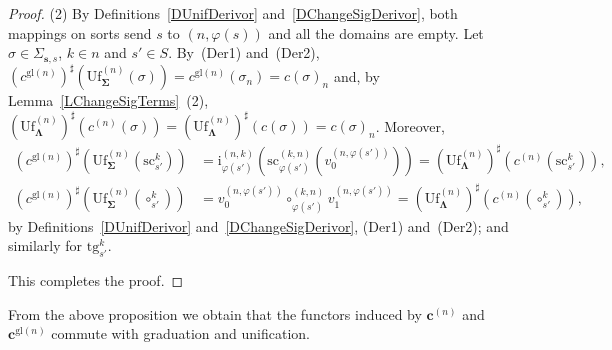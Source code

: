 \documentclass[a4paper, reqno
]{amsart}
\newcommand{\sig}[1]{\mathbf{#1}}             %
\newcommand{\gl}{\mathrm{gl}}                %
\newcommand{\src}{\mathrm{sc}}
\newcommand{\tgt}{\mathrm{tg}}
\newcommand{\Uf}{\mathrm{Uf}}
\theoremstyle{plain}
\theoremstyle{definition}
\begin{document}
\begin{proof}
(2) By Definitions~\ref{DUnifDerivor} and~\ref{DChangeSigDerivor}, both mappings on sorts send $s$ to $(n,\varphi(s))$ and all the domains are empty.
Let $\sigma\in\Sigma_{\mathbf{s},s}$, $k\in n$ and $s'\in S$.
By~(Der1) and~(Der2), $(c^{\gl(n)})^{\sharp}(\Uf^{(n)}_{\sig{\Sigma}}(\sigma))=c^{\gl(n)}(\sigma_{n})=c(\sigma)_{n}$ and, by Lemma~\ref{LChangeSigTerms}~(2), $(\Uf^{(n)}_{\sig{\Lambda}})^{\sharp}(c^{(n)}(\sigma))=(\Uf^{(n)}_{\sig{\Lambda}})^{\sharp}(c(\sigma))=c(\sigma)_{n}$.
Moreover,
\begin{align*}
(c^{\gl(n)})^{\sharp}\left(\Uf^{(n)}_{\sig{\Sigma}}(\src^{k}_{s'})\right)
&=
\mathrm{i}^{(n,k)}_{\varphi(s')}\left(\src^{(k,n)}_{\varphi(s')}\left(v^{(n,\varphi(s'))}_{0}\right)\right)
=
(\Uf^{(n)}_{\sig{\Lambda}})^{\sharp}\left(c^{(n)}(\src^{k}_{s'})\right),
\\
(c^{\gl(n)})^{\sharp}\left(\Uf^{(n)}_{\sig{\Sigma}}(\circ^{k}_{s'})\right)
&=
v^{(n,\varphi(s'))}_{0}\circ^{(k,n)}_{\varphi(s')}v^{(n,\varphi(s'))}_{1}
=
(\Uf^{(n)}_{\sig{\Lambda}})^{\sharp}\left(c^{(n)}(\circ^{k}_{s'})\right),
\end{align*}
by Definitions~\ref{DUnifDerivor} and~\ref{DChangeSigDerivor}, (Der1) and~(Der2); and similarly for $\tgt^{k}_{s'}$.

This completes the proof.
\end{proof}

From the above proposition we obtain that the functors induced by $\mathbf{c}^{(n)}$ and $\mathbf{c}^{\gl(n)}$ commute with graduation and unification.
\end{document}
